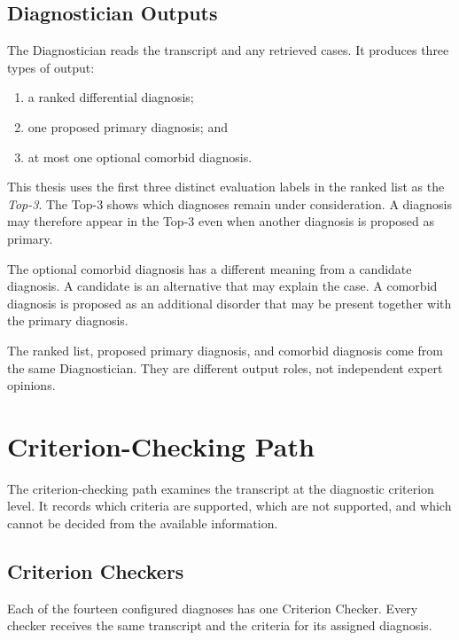 \documentclass[12pt,a4paper,oneside]{report}
\begin{document}
\subsection{Diagnostician Outputs}
\label{sec:diagnostician-outputs}

The Diagnostician reads the transcript and any retrieved cases. It
produces three types of output:

\begin{enumerate}
    \item a ranked differential diagnosis;
    \item one proposed primary diagnosis; and
    \item at most one optional comorbid diagnosis.
\end{enumerate}

This thesis uses the first three distinct evaluation labels in the ranked
list as the \emph{Top-3}. The Top-3 shows which diagnoses remain under
consideration. A diagnosis may therefore appear in the Top-3 even when
another diagnosis is proposed as primary.

The optional comorbid diagnosis has a different meaning from a candidate
diagnosis. A candidate is an alternative that may explain the case. A
comorbid diagnosis is proposed as an additional disorder that may be
present together with the primary diagnosis.

The ranked list, proposed primary diagnosis, and comorbid diagnosis come
from the same Diagnostician. They are different output roles, not
independent expert opinions.

\section{Criterion-Checking Path}
\label{sec:criterion-checking-path}

The criterion-checking path examines the transcript at the diagnostic
criterion level. It records which criteria are supported, which are not
supported, and which cannot be decided from the available information.

\subsection{Criterion Checkers}
\label{sec:criterion-checkers}

Each of the fourteen configured diagnoses has one Criterion Checker.
Every checker receives the same transcript and the criteria for its
assigned diagnosis.
\end{document}
